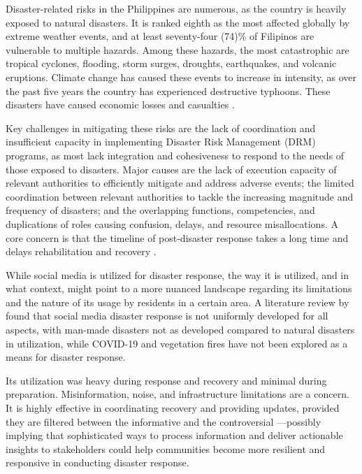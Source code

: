 \documentclass[12pt,a4paper]{report}
\begin{document}
Disaster-related risks in the Philippines are numerous, as the country is
heavily exposed to natural disasters. It is ranked eighth as the most affected
globally by extreme weather events, and at least seventy-four (74)\% of
Filipinos are vulnerable to multiple hazards. Among these hazards, the most
catastrophic are tropical cyclones, flooding, storm surges, droughts,
earthquakes, and volcanic eruptions. Climate change has caused these events to
increase in intensity, as over the past five years the country has experienced
destructive typhoons. These disasters have caused economic losses and
casualties \parencite{worldbank2023}.

Key challenges in mitigating these risks are the lack of coordination and
insufficient capacity in implementing Disaster Risk Management (DRM) programs,
as most lack integration and cohesiveness to respond to the needs of those
exposed to disasters. Major causes are the lack of execution capacity of
relevant authorities to efficiently mitigate and address adverse events; the
limited coordination between relevant authorities to tackle the increasing
magnitude and frequency of disasters; and the overlapping functions,
competencies, and duplications of roles causing confusion, delays, and
resource misallocations. A core concern is that the timeline of post-disaster
response takes a long time and delays rehabilitation and recovery
\parencite{worldbank2023}.

While social media is utilized for disaster response, the way it is utilized,
and in what context, might point to a more nuanced landscape regarding its
limitations and the nature of its usage by residents in a certain area. A
literature review by \parencite{inferio2025} found that social media disaster
response is not uniformly developed for all aspects, with man-made disasters
not as developed compared to natural disasters in utilization, while COVID-19
and vegetation fires have not been explored as a means for disaster response.

Its utilization was heavy during response and recovery and minimal during preparation. 
Misinformation, noise, and infrastructure limitations are a concern. It is highly effective
in coordinating recovery and providing updates, provided they are filtered
between the informative and the controversial \parencite{inferio2025}---possibly
implying that sophisticated ways to process information and deliver actionable
insights to stakeholders could help communities become more resilient and
responsive in conducting disaster response.
\end{document}
